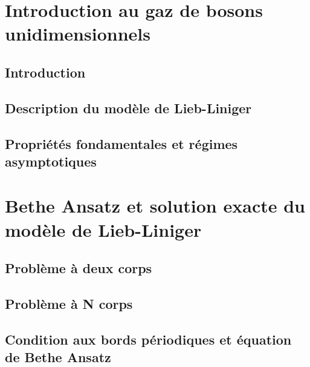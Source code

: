 \section{Introduction au gaz de bosons unidimensionnels}




\subsection*{Introduction}

\subsection{Description du modèle de Lieb-Liniger}

\subsection{Propriétés fondamentales et régimes asymptotiques}

\section{Bethe Ansatz et solution exacte du modèle de Lieb-Liniger}
\subsection{Problème à deux corps}
\subsection{Problème à N corps}
\subsection{Condition aux bords périodiques et équation de Bethe Ansatz}


